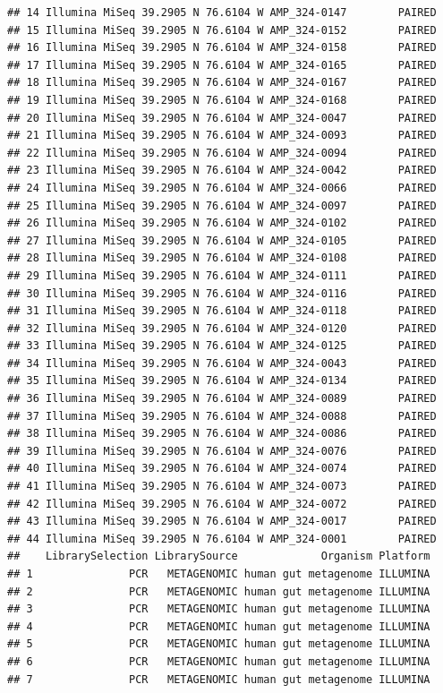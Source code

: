 \documentclass[
]{article}
\begin{document}
\begin{verbatim}
## 14 Illumina MiSeq 39.2905 N 76.6104 W AMP_324-0147        PAIRED
## 15 Illumina MiSeq 39.2905 N 76.6104 W AMP_324-0152        PAIRED
## 16 Illumina MiSeq 39.2905 N 76.6104 W AMP_324-0158        PAIRED
## 17 Illumina MiSeq 39.2905 N 76.6104 W AMP_324-0165        PAIRED
## 18 Illumina MiSeq 39.2905 N 76.6104 W AMP_324-0167        PAIRED
## 19 Illumina MiSeq 39.2905 N 76.6104 W AMP_324-0168        PAIRED
## 20 Illumina MiSeq 39.2905 N 76.6104 W AMP_324-0047        PAIRED
## 21 Illumina MiSeq 39.2905 N 76.6104 W AMP_324-0093        PAIRED
## 22 Illumina MiSeq 39.2905 N 76.6104 W AMP_324-0094        PAIRED
## 23 Illumina MiSeq 39.2905 N 76.6104 W AMP_324-0042        PAIRED
## 24 Illumina MiSeq 39.2905 N 76.6104 W AMP_324-0066        PAIRED
## 25 Illumina MiSeq 39.2905 N 76.6104 W AMP_324-0097        PAIRED
## 26 Illumina MiSeq 39.2905 N 76.6104 W AMP_324-0102        PAIRED
## 27 Illumina MiSeq 39.2905 N 76.6104 W AMP_324-0105        PAIRED
## 28 Illumina MiSeq 39.2905 N 76.6104 W AMP_324-0108        PAIRED
## 29 Illumina MiSeq 39.2905 N 76.6104 W AMP_324-0111        PAIRED
## 30 Illumina MiSeq 39.2905 N 76.6104 W AMP_324-0116        PAIRED
## 31 Illumina MiSeq 39.2905 N 76.6104 W AMP_324-0118        PAIRED
## 32 Illumina MiSeq 39.2905 N 76.6104 W AMP_324-0120        PAIRED
## 33 Illumina MiSeq 39.2905 N 76.6104 W AMP_324-0125        PAIRED
## 34 Illumina MiSeq 39.2905 N 76.6104 W AMP_324-0043        PAIRED
## 35 Illumina MiSeq 39.2905 N 76.6104 W AMP_324-0134        PAIRED
## 36 Illumina MiSeq 39.2905 N 76.6104 W AMP_324-0089        PAIRED
## 37 Illumina MiSeq 39.2905 N 76.6104 W AMP_324-0088        PAIRED
## 38 Illumina MiSeq 39.2905 N 76.6104 W AMP_324-0086        PAIRED
## 39 Illumina MiSeq 39.2905 N 76.6104 W AMP_324-0076        PAIRED
## 40 Illumina MiSeq 39.2905 N 76.6104 W AMP_324-0074        PAIRED
## 41 Illumina MiSeq 39.2905 N 76.6104 W AMP_324-0073        PAIRED
## 42 Illumina MiSeq 39.2905 N 76.6104 W AMP_324-0072        PAIRED
## 43 Illumina MiSeq 39.2905 N 76.6104 W AMP_324-0017        PAIRED
## 44 Illumina MiSeq 39.2905 N 76.6104 W AMP_324-0001        PAIRED
##    LibrarySelection LibrarySource             Organism Platform
## 1               PCR   METAGENOMIC human gut metagenome ILLUMINA
## 2               PCR   METAGENOMIC human gut metagenome ILLUMINA
## 3               PCR   METAGENOMIC human gut metagenome ILLUMINA
## 4               PCR   METAGENOMIC human gut metagenome ILLUMINA
## 5               PCR   METAGENOMIC human gut metagenome ILLUMINA
## 6               PCR   METAGENOMIC human gut metagenome ILLUMINA
## 7               PCR   METAGENOMIC human gut metagenome ILLUMINA

\end{verbatim}
\end{document}
